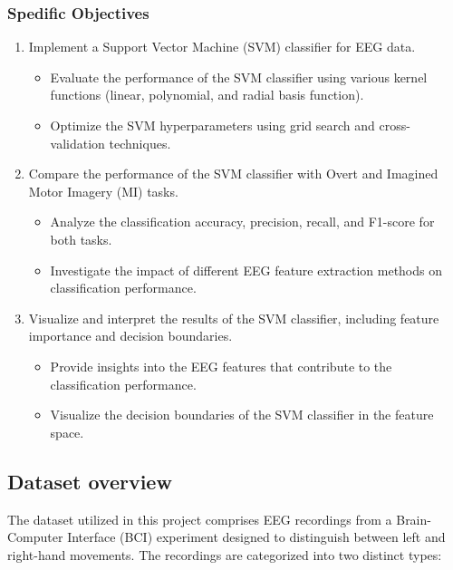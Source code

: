 \documentclass[
  letterpaper,
  DIV=11,
  numbers=noendperiod]{scrartcl}
\providecommand{\tightlist}{%
  \setlength{\itemsep}{0pt}\setlength{\parskip}{0pt}}\usepackage{longtable,booktabs,array}
\begin{document}
\subsubsection{Spedific Objectives}\label{spedific-objectives}

\begin{enumerate}
\def\labelenumi{\arabic{enumi}.}
\tightlist
\item
  Implement a Support Vector Machine (SVM) classifier for EEG data.

  \begin{itemize}
  \tightlist
  \item
    Evaluate the performance of the SVM classifier using various kernel
    functions (linear, polynomial, and radial basis function).
  \item
    Optimize the SVM hyperparameters using grid search and
    cross-validation techniques.
  \end{itemize}
\item
  Compare the performance of the SVM classifier with Overt and Imagined
  Motor Imagery (MI) tasks.

  \begin{itemize}
  \tightlist
  \item
    Analyze the classification accuracy, precision, recall, and F1-score
    for both tasks.
  \item
    Investigate the impact of different EEG feature extraction methods
    on classification performance.
  \end{itemize}
\item
  Visualize and interpret the results of the SVM classifier, including
  feature importance and decision boundaries.

  \begin{itemize}
  \tightlist
  \item
    Provide insights into the EEG features that contribute to the
    classification performance.
  \item
    Visualize the decision boundaries of the SVM classifier in the
    feature space.
  \end{itemize}
\end{enumerate}

\subsection{Dataset overview}\label{dataset-overview}

The dataset utilized in this project comprises EEG recordings from a
Brain-Computer Interface (BCI) experiment designed to distinguish
between left and right-hand movements. The recordings are categorized
into two distinct types:
\end{document}
